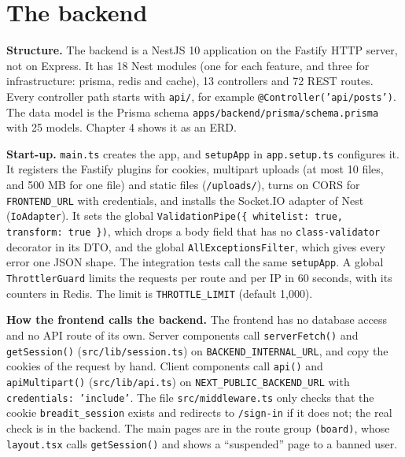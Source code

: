 \section{The backend}
\label{sec:impl-backend}

\textbf{Structure.} The backend is a NestJS 10 application on the Fastify HTTP server, not on Express. It has 18 Nest modules (one for each feature, and three for infrastructure: prisma, redis and cache), 13 controllers and 72 REST routes. Every controller path starts with \texttt{api/}, for example \texttt{@Controller('api/posts')}. The data model is the Prisma schema \texttt{apps/backend/prisma/schema.prisma} with 25 models. Chapter 4 shows it as an ERD.

\textbf{Start-up.} \texttt{main.ts} creates the app, and \texttt{setupApp} in \texttt{app.setup.ts} configures it. It registers the Fastify plugins for cookies, multipart uploads (at most 10 files, and 500 MB for one file) and static files (\texttt{/uploads/}), turns on CORS for \texttt{FRONTEND\_URL} with credentials, and installs the Socket.IO adapter of Nest (\texttt{IoAdapter}). It sets the global \texttt{ValidationPipe(\{ whitelist: true, transform: true \})}, which drops a body field that has no \texttt{class-validator} decorator in its DTO, and the global \texttt{AllExceptionsFilter}, which gives every error one JSON shape. The integration tests call the same \texttt{setupApp}. A global \texttt{ThrottlerGuard} limits the requests per route and per IP in 60 seconds, with its counters in Redis. The limit is \texttt{THROTTLE\_LIMIT} (default 1,000).

\textbf{How the frontend calls the backend.} The frontend has no database access and no API route of its own. Server components call \texttt{serverFetch()} and \texttt{getSession()} (\texttt{src/lib/session.ts}) on \texttt{BACKEND\_INTERNAL\_URL}, and copy the cookies of the request by hand. Client components call \texttt{api()} and \texttt{apiMultipart()} (\texttt{src/lib/api.ts}) on \texttt{NEXT\_PUBLIC\_BACKEND\_URL} with \texttt{credentials: 'include'}. The file \texttt{src/middleware.ts} only checks that the cookie \texttt{breadit\_session} exists and redirects to \texttt{/sign-in} if it does not; the real check is in the backend. The main pages are in the route group \texttt{(board)}, whose \texttt{layout.tsx} calls \texttt{getSession()} and shows a ``suspended'' page to a banned user.

